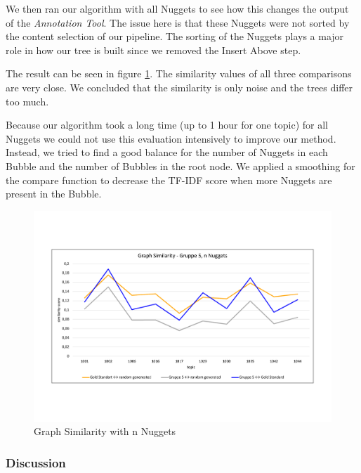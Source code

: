 We then ran our algorithm with all Nuggets to see how this changes the output of the \textit{Annotation Tool}. The issue here is that these Nuggets were not sorted by the content selection of our pipeline. The sorting of the Nuggets plays a major role in how our tree is built since we removed the Insert Above step.

The result can be seen in figure \ref{fig:graphn}. The similarity values of all three comparisons are very close. We concluded that the similarity is only noise and the trees differ too much.

Because our algorithm took a long time (up to 1 hour for one topic) for all Nuggets we could not use this evaluation intensively to improve our method. Instead, we tried to find a good balance for the number of Nuggets in each Bubble and the number of Bubbles in the root node. We applied a smoothing for the compare function to decrease the TF-IDF score when more Nuggets are present in the Bubble.

\begin{figure}[H]
	\centering
	\includegraphics[trim= 0 130 0 130,width=\textwidth]{img/sim_v2.pdf}
	\caption{Graph Similarity with n Nuggets}
	\label{fig:graphn}
\end{figure}



\subsubsection{Discussion}




